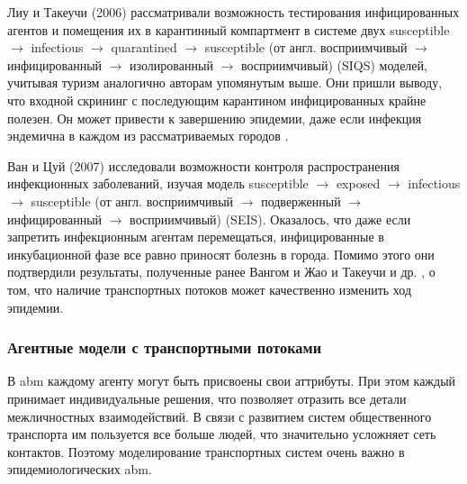 \documentclass[a4paper,12pt]{article} %
\begin{document}
Лиу и Такеучи (2006) \cite{liu2006spread} рассматривали возможность тестирования инфицированных агентов и помещения их в карантинный компартмент в системе двух susceptible $\rightarrow$ infectious $\rightarrow$ quarantined $\rightarrow$ susceptible (от англ. восприимчивый $\rightarrow$ инфицированный $\rightarrow$ изолированный $\rightarrow$ восприимчивый) (SIQS) моделей, учитывая туризм аналогично авторам упомянутым выше. Они пришли выводу, что входной скрининг с последующим карантином инфицированных крайне полезен. Он может привести к завершению эпидемии, даже если инфекция эндемична в каждом из рассматриваемых городов \cite{liu2006spread}.

Ван и Цуй (2007) \cite{wan2007seis} исследовали возможности контроля распространения инфекционных заболеваний, изучая модель susceptible $\rightarrow$ exposed $\rightarrow$ infectious $\rightarrow$ susceptible (от англ. восприимчивый $\rightarrow$ подверженный $\rightarrow$ инфицированный $\rightarrow$ восприимчивый) (SEIS). Оказалось, что даже если запретить инфекционным агентам перемещаться, инфицированные в инкубационной фазе все равно приносят болезнь в города.                                                                                                                                                                                                                                                                                                                          Помимо этого они подтвердили результаты, полученные ранее Вангом и Жао \cite{wang2004epidemic} и Такеучи и др. \cite{takeuchi2006spreading}, о том, что наличие транспортных потоков может качественно изменить ход эпидемии.


\subsubsection{Агентные модели с транспортными потоками}
В \gls{abm} каждому агенту могут быть присвоены свои аттрибуты. При этом каждый принимает индивидуальные решения, что позволяет отразить все детали межличностных взаимодействий. В связи с развитием систем общественного транспорта им пользуется все больше людей, что значительно усложняет сеть контактов. Поэтому моделирование транспортных систем очень важно в эпидемиологических \gls{abm}.
\end{document}
